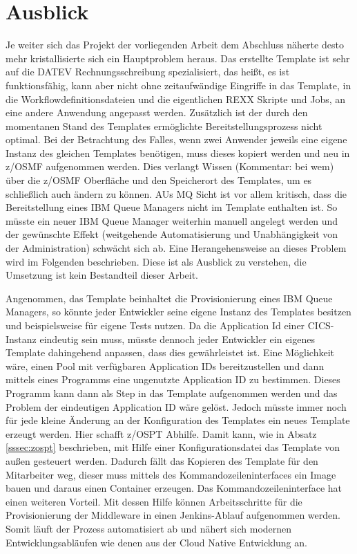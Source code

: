 \chapter{Ausblick}\label{ch:ausblick}
Je weiter sich das Projekt der vorliegenden Arbeit dem Abschluss näherte desto mehr kristallisierte sich ein Hauptproblem heraus.
Das erstellte Template ist sehr auf die DATEV Rechnungsschreibung spezialisiert, das heißt, es ist funktionsfähig, kann aber nicht ohne zeitaufwändige Eingriffe in das Template, in die Workflowdefinitionsdateien und die eigentlichen REXX Skripte und Jobs, an eine andere Anwendung angepasst werden. 
Zusätzlich ist der durch den momentanen Stand des Templates ermöglichte Bereitstellungsprozess nicht optimal.
Bei der Betrachtung des Falles, wenn zwei Anwender jeweils eine eigene Instanz des gleichen Templates benötigen, muss dieses kopiert werden und neu in z/OSMF aufgenommen werden.
Dies verlangt Wissen (Kommentar: bei wem)  über die z/OSMF Oberfläche und den Speicherort des Templates, um es schließlich auch ändern zu können.
AUs MQ Sicht ist vor allem kritisch, dass die Bereitstellung eines IBM Queue Managers nicht im Template enthalten ist.
So müsste ein neuer IBM Queue Manager weiterhin manuell angelegt werden und der gewünschte Effekt (weitgehende Automatisierung und Unabhängigkeit von der Administration) schwächt sich ab.
Eine Herangehensweise an dieses Problem wird im Folgenden beschrieben.
Diese ist als Ausblick zu verstehen, die Umsetzung ist kein Bestandteil dieser Arbeit.

Angenommen, das Template beinhaltet die Provisionierung eines IBM Queue Managers, so könnte jeder Entwickler seine eigene Instanz des Templates besitzen und beispielsweise für eigene Tests nutzen.
Da die Application Id einer CICS-Instanz eindeutig sein muss, müsste dennoch jeder Entwickler ein eigenes Template dahingehend anpassen, dass dies gewährleistet ist.
Eine Möglichkeit wäre, einen Pool mit verfügbaren Application IDs bereitzustellen und dann mittels eines Programms eine ungenutzte Application ID zu bestimmen.
Dieses Programm kann dann als Step in das Template aufgenommen werden und das Problem der eindeutigen Application ID wäre gelöst.
Jedoch müsste immer noch für jede kleine Änderung an der Konfiguration des Templates ein neues Template erzeugt werden.
Hier schafft z/OSPT Abhilfe.
Damit kann, wie in Absatz \ref{sssec:zospt} beschrieben, mit Hilfe einer Konfigurationsdatei das Template von außen gesteuert werden.
Dadurch fällt das Kopieren des Template für den Mitarbeiter weg, dieser muss mittels des Kommandozeileninterfaces ein Image bauen und daraus einen Container erzeugen.
Das Kommandozeileninterface hat einen weiteren Vorteil.
Mit dessen Hilfe können Arbeitsschritte für die Provisionierung der Middleware in einen Jenkins-Ablauf aufgenommen werden.
Somit läuft der Prozess automatisiert ab und nähert sich modernen Entwicklungsabläufen wie denen aus der Cloud Native Entwicklung an.

